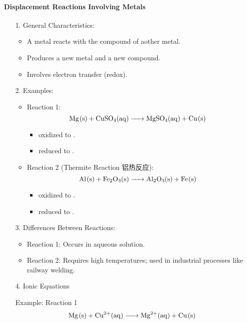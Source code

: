 \paragraph{Displacement Reactions Involving Metals}
\begin{itemize}
    \item[1.] General Characteristics:
    \begin{itemize}
        \item A metal reacts with the compound of aother metal.
        \item Produces a new metal and a new compound.
        \item Involves electron transfer (redox).
    \end{itemize}
    \item[2.] Examples:
    \begin{itemize}
        \item Reaction 1:
        \begin{equation}
            \ce{Mg(s) + CuSO4(aq) -> MgSO4(aq) + Cu(s)}
        \end{equation}
        \begin{itemize}
            \item {} oxidized to .
            \item {} reduced to .
        \end{itemize}
        \item Reaction 2 (Thermite Reaction 铝热反应):
        \begin{equation}
            \ce{Al(s) + Fe2O3(s) -> Al2O3(s) + Fe(s)}
        \end{equation}
        \begin{itemize}
            \item {} oxidized to .
            \item {} reduced to .
        \end{itemize}
    \end{itemize}
    \item[3.] Differences Between Reactions:
    \begin{itemize}
        \item Reaction 1: Occurs in aqueous solution.
        \item Reaction 2: Requires high temperatures; used in industrial processes like railway welding.
    \end{itemize}
    \item[4.] Ionic Equations\par
    Example: Reaction 1
    \begin{equation}
        \ce{Mg(s) + Cu^2+(aq) -> Mg^2+(aq) + Cu(s)}
    \end{equation}
\end{itemize}

